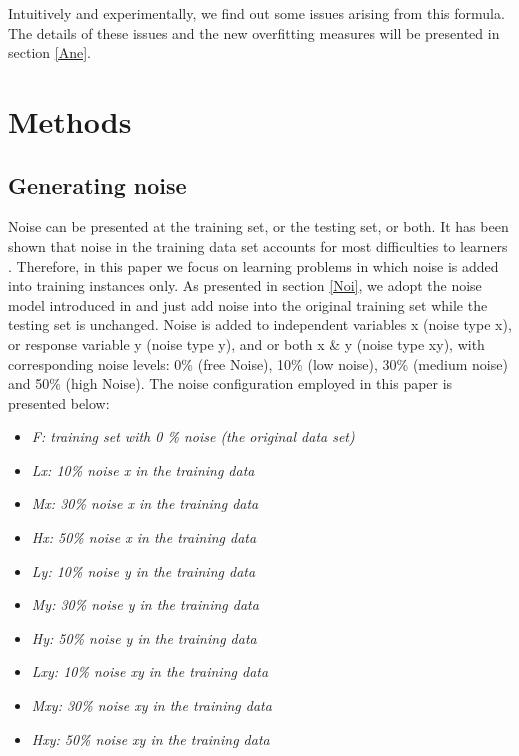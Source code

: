 Intuitively and experimentally, we find out some issues arising from this formula. The details of these issues and the new overfitting measures will be presented in section \ref{Ane}.

\section{Methods}
\label{Met}
\subsection{Generating noise}
\label{Gen}
Noise can be presented at the training set, or the testing set, or both. It has been shown that noise in the training data set accounts for most difficulties to learners \cite{2011Nic}. Therefore, in this paper we focus on learning problems in which noise is added into training instances only. As presented in section \ref{Noi}, we adopt the noise model introduced in \cite{2010Dav} and just add noise into the original training set while the testing set is unchanged.  Noise is added to independent variables x (noise type x), or response variable y (noise type y), and or both x \& y (noise type xy), with corresponding noise levels: 0\% (free Noise), 10\% (low noise), 30\% (medium noise) and 50\% (high Noise). The noise configuration employed in this paper is presented below:\par

\begin{itemize}
\item \textit{F: training set with 0 \% noise (the original data set)}
\item \textit{Lx: 10\% noise x in the training data}
\item \textit{Mx: 30\% noise x in the training data}
\item \textit{Hx: 50\% noise x in the training data}
\item \textit{Ly: 10\% noise y in the training data}
\item \textit{My: 30\% noise y in the training data}
\item \textit{Hy: 50\% noise y in the training data}
\item \textit{Lxy: 10\% noise xy in the training data}
\item \textit{Mxy: 30\% noise xy in the training data}
\item \textit{Hxy: 50\% noise xy in the training data}
\end{itemize} \par

